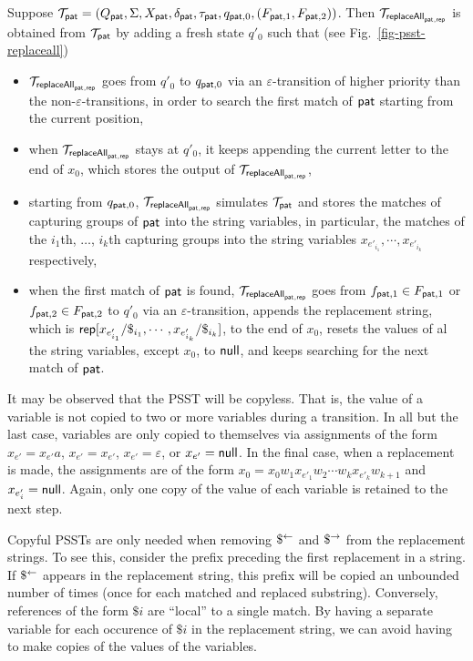  Suppose $\mathcal{T}_{\mathsf{pat}} = (Q_{\mathsf{pat}}, \Sigma, X_{\mathsf{pat}}, \delta_{\mathsf{pat}}, \tau_{\mathsf{pat}}, q_{\mathsf{pat},0}, (F_{\mathsf{pat},1}, F_{\mathsf{pat},2}))$.
Then $\mathcal{T}_{\mathsf{replaceAll}_{\mathsf{pat},\mathsf{rep}}}$ is obtained from $\mathcal{T}_{\mathsf{pat}}$ by adding a fresh state $q'_0$ such that (see Fig.~\ref{fig-psst-replaceall})
\begin{itemize}
    \item $\mathcal{T}_{\mathsf{replaceAll}_{\mathsf{pat},\mathsf{rep}}}$ goes from $q'_0$ to $q_{\mathsf{pat},0}$ via an $\varepsilon$-transition of higher priority than the non-$\varepsilon$-transitions, in order to search the first match of $\mathsf{pat}$ starting from the current position,
    \item when $\mathcal{T}_{\mathsf{replaceAll}_{\mathsf{pat},\mathsf{rep}}}$ stays at $q'_0$, it keeps appending the current letter to the end of $x_0$, which stores the output of $\mathcal{T}_{\mathsf{replaceAll}_{\mathsf{pat},\mathsf{rep}}}$,
    \item starting from $q_{\mathsf{pat}, 0}$, $\mathcal{T}_{\mathsf{replaceAll}_{\mathsf{pat},\mathsf{rep}}}$ simulates $\mathcal{T}_{\mathsf{pat}}$ and stores the matches of capturing groups of $\mathsf{pat}$ into the string variables, in particular,
    the matches of the $i_1$th, $\ldots$, $i_k$th capturing groups into the string variables $x_{e'_{i_1}}, \cdots, x_{e'_{i_k}}$ respectively,
    \item when the first match of $\mathsf{pat}$ is found, $\mathcal{T}_{\mathsf{replaceAll}_{\mathsf{pat},\mathsf{rep}}}$ goes from $f_{\mathsf{pat},1} \in F_{\mathsf{pat}, 1}$ or $f_{\mathsf{pat}, 2} \in F_{\mathsf{pat}, 2}$ to $q'_0$ via an $\varepsilon$-transition, appends the replacement string, which is $\mathsf{rep}[x_{e'_{i_1}}/\$_{i_1}, \cdots, x_{e'_{i_k}}/\$_{i_k}]$, to the end of $x_0$, resets the values of al the string variables, except $x_0$, to $\mathsf{null}$, and keeps searching for the next match of $\mathsf{pat}$.
\end{itemize}

It may be observed that the PSST will be copyless.
That is, the value of a variable is not copied to two or more variables during a transition.
In all but the last case, variables are only copied to themselves via assignments of the form $x_{e'} = x_{e'} a$, $x_{e'} = x_{e'}$, $x_{e'} = \varepsilon$, or $x_{e'} = \mathsf{null}$.
In the final case, when a replacement is made, the assignments are of the form
$x_0 = x_0 w_1 x_{e'_1} w_2 \cdots w_k x_{e'_k} w_{k+1}$
and
$x_{e'_i} = \mathsf{null}$.
Again, only one copy of the value of each variable is retained to the next step.

Copyful PSSTs are only needed when removing $\$^{\leftarrow}$ and $\$^{\rightarrow}$ from the replacement strings.
To see this, consider the prefix preceding the first replacement in a string.
If $\$^{\leftarrow}$ appears in the replacement string, this prefix will be copied an unbounded number of times (once for each matched and replaced substring).
Conversely, references of the form $\$i$ are ``local'' to a single match.
By having a separate variable for each occurence of $\$i$ in the replacement string, we can avoid having to make copies of the values of the variables.

